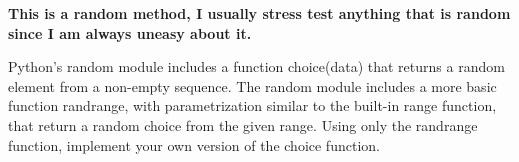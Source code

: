  \label{sssec:ex1_12}

\textbf{This is a random method, I usually stress test anything that is random since I am always uneasy about it.}

Python's random module includes a function choice(data) that returns a random element from a non-empty sequence. The random module includes a more basic function randrange, with parametrization similar to the built-in range function, that return a random choice from the given range. Using only the randrange function, implement your own version of the choice function.


